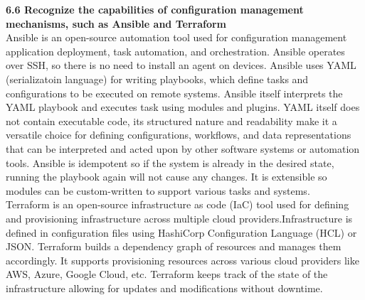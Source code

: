 \documentclass{article}
\begin{document}
\textbf{6.6 Recognize the capabilities of configuration management mechanisms, such as Ansible and Terraform}\\

Ansible is an open-source automation tool used for configuration management application deployment, task automation, and orchestration. Ansible operates over SSH, so there is no need to install an agent on devices. Ansible uses YAML (serializatoin language) for writing playbooks, which define tasks and configurations to be executed on remote systems. Ansible itself interprets the YAML playbook and executes task using modules and plugins. YAML itself does not contain executable code, its structured nature and readability make it a versatile choice for defining configurations, workflows, and data representations that can be interpreted and acted upon by other software systems or automation tools. Ansible is idempotent so if the system is already in the desired state, running the playbook again will not cause any changes. It is extensible so modules can be custom-written to support various tasks and systems.\\

	Terraform is an open-source infrastructure as code (IaC) tool used for defining and provisioning infrastructure across multiple cloud providers.Infrastructure is defined in configuration files using HashiCorp Configuration Language (HCL) or JSON. Terraform builds a dependency graph of resources and manages them accordingly. It supports provisioning resources across various cloud providers like AWS, Azure, Google Cloud, etc. Terraform keeps track of the state of the infrastructure allowing for updates and modifications without downtime.\\
  
\end{document}
